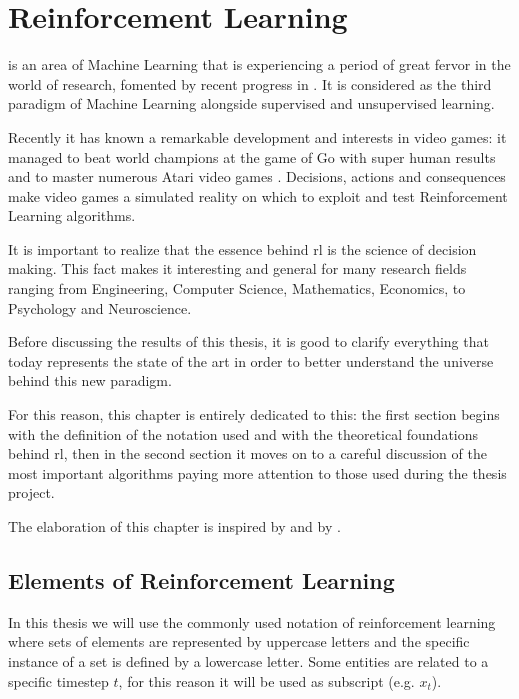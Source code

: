 \chapter{Reinforcement Learning}

 is an area of Machine Learning that is experiencing a period of great fervor in the world of research, fomented by recent progress in . It is considered as the third paradigm of Machine Learning alongside supervised and unsupervised learning.

Recently it has known a remarkable development and interests in video games: it managed to beat world champions at the game of Go \cite{silver2016mastering} with super human results and to master numerous Atari video games \cite{mnih2013playing}. Decisions, actions and consequences make video games a simulated reality on which to exploit and test Reinforcement Learning algorithms.

It is important to realize that the essence behind \gls{rl} is the science of decision making. This fact makes it interesting and general for many research fields ranging from Engineering, Computer Science, Mathematics, Economics, to Psychology and Neuroscience.

Before discussing the results of this thesis, it is good to clarify everything that today represents the state of the art in order to better understand the universe behind this new paradigm.

For this reason, this chapter is entirely dedicated to this: the first section begins with the definition of the notation used and with the theoretical foundations behind \gls{rl}, then in the second section it moves on to a careful discussion of the most important algorithms paying more attention to those used during the thesis project.

The elaboration of this chapter is inspired by \cite{silver2015lectures} and by \cite{sutton2018reinforcement}.

\section{Elements of Reinforcement Learning}

In this thesis we will use the commonly used notation of reinforcement learning where sets of elements are represented by uppercase letters and the specific instance of a set is defined by a lowercase letter. Some entities are related to a specific timestep $t$, for this reason it will be used as subscript (e.g. $x_t$).

